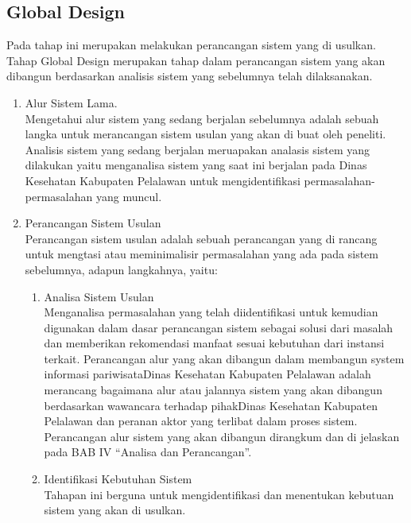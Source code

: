 \subsection{Global Design}
Pada tahap ini merupakan melakukan perancangan sistem yang di usulkan. Tahap Global Design merupakan tahap dalam perancangan sistem yang akan dibangun berdasarkan analisis sistem yang sebelumnya telah dilaksanakan.
\begin{enumerate}
	\item 	Alur Sistem Lama.\\
	Mengetahui alur sistem yang sedang berjalan sebelumnya adalah sebuah langka untuk merancangan sistem usulan yang akan di buat oleh peneliti. Analisis sistem yang sedang berjalan meruapakan analasis sistem yang dilakukan yaitu menganalisa sistem yang saat ini berjalan pada Dinas Kesehatan Kabupaten Pelalawan untuk mengidentifikasi permasalahan-permasalahan yang muncul.
	\item	Perancangan Sistem Usulan\\
	Perancangan sistem usulan adalah sebuah perancangan yang di rancang untuk mengtasi atau meminimalisir permasalahan yang ada pada sistem sebelumnya, adapun langkahnya, yaitu:
	\begin{enumerate}
		\item	Analisa Sistem Usulan\\
		Menganalisa permasalahan yang telah diidentifikasi untuk kemudian digunakan dalam dasar perancangan sistem sebagai solusi dari masalah dan memberikan rekomendasi manfaat sesuai kebutuhan dari instansi terkait. Perancangan alur yang akan dibangun dalam membangun system informasi pariwisataDinas Kesehatan Kabupaten Pelalawan adalah merancang bagaimana alur atau jalannya sistem yang akan dibangun berdasarkan wawancara terhadap pihakDinas Kesehatan Kabupaten Pelalawan dan peranan aktor yang terlibat dalam proses sistem. Perancangan alur sistem yang akan dibangun dirangkum dan di jelaskan pada BAB IV “Analisa dan Perancangan”.
		\item	Identifikasi Kebutuhan Sistem\\
		Tahapan ini berguna untuk mengidentifikasi dan menentukan kebutuan sistem yang akan di usulkan.
	\end{enumerate}
\end{enumerate}

